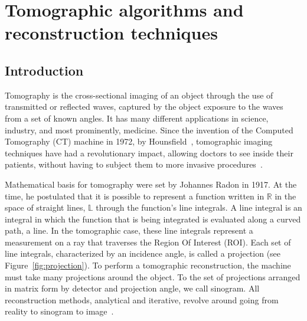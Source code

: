 

\section{Tomographic algorithms and reconstruction techniques}%
\label{sec:tomographic_algorithms_and_reconstruction_techniques}

\subsection{Introduction}%
\label{sub:tomography_introduction}

Tomography is the cross-sectional imaging of an object through the use
of transmitted or reflected waves, captured by the object exposure to
the waves from a set of known angles. It has many different applications
in science, industry, and most prominently, medicine. Since the
invention of the Computed Tomography (\gls{CT}) machine in 1972, by
Hounsfield~\cite{Gunderman2006}, tomographic imaging techniques have had
a revolutionary impact, allowing doctors to see inside their patients,
without having to subject them to more invasive
procedures~\cite{Kak2001}.

Mathematical basis for tomography were set by Johannes Radon in 1917. At
the time, he postulated that  it is possible to represent a function
written in $\mathbb{R}$ in the space of straight lines, $\mathbb{L}$
through the function's line integrals. A line integral is an integral in
which the function that is being integrated is evaluated along a curved
path, a line. In the tomographic case, these line integrals represent a
measurement on a ray that traverses the Region Of Interest (\gls{ROI}).
Each set of line integrals, characterized by an incidence angle, is
called a projection (see Figure~\ref{fig:projection}). To perform a
tomographic reconstruction, the machine must take many projections
around the object. To the set of projections arranged in matrix form by
detector and projection angle, we call sinogram. All reconstruction
methods, analytical and iterative, revolve around going from reality to
sinogram to image~\cite{Bruyant2002, Kak2001, Herman1973, Herman1995,
Herman2009, Defrise2003}.

